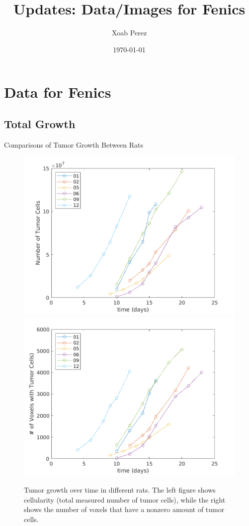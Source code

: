 \documentclass{beamer}
\title[Updates]{Updates: Data/Images for Fenics}
\author{Xoab Perez}
\date{\today}
\begin{document}
\begin{frame}
  \titlepage
\end{frame}


\section{Data for Fenics}
\subsection{Total Growth}

\begin{frame}{Comparisons of Tumor Growth Between Rats}
	\begin{minipage}[T][.7\textheight][t]{\textwidth}
		\begin{figure}
    	\centering
    	\includegraphics[width=.45\textwidth]{../../mouse-data/numtumorcells.png}    	
    	\includegraphics[width=.45\textwidth]{../../mouse-data/voxtumorcells.png}
    	\caption{Tumor growth over time in different rats. The left figure shows cellularity (total measured number of tumor cells), while the right shows the number of voxels that have a nonzero amount of tumor cells.}
    	\end{figure}
	\end{minipage}
\end{frame}
\end{document}
